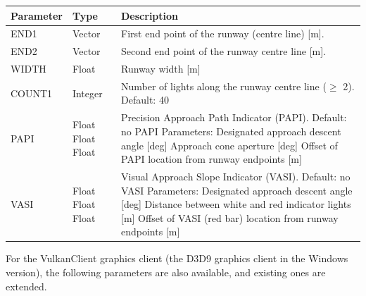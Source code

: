 \documentclass[Orbiter Developer Manual.tex]{subfiles}
\begin{document}
	\begin{longtable}{ |p{}|p{}|p{}| }
	\hline\rule{0pt}{2ex}
	\textbf{Parameter} & \textbf{Type} & \textbf{Description}\\
	\hline\rule{0pt}{2ex}
	END1 & Vector & First end point of the runway (centre line) [m].\\
	\hline\rule{0pt}{2ex}
	END2 & Vector & Second end point of the runway centre line [m].\\
	\hline\rule{0pt}{2ex}
	WIDTH & Float & Runway width [m]\\
	\hline\rule{0pt}{2ex}
	COUNT1 & Integer & Number of lights along the runway centre line ($\geq$ 2). Default: 40\\
	\hline\rule{0pt}{2ex}
	PAPI & Float Float Float & Precision Approach Path Indicator (PAPI). Default: no PAPI\newline
	Parameters:\newline
	Designated approach descent angle [deg]\newline
	Approach cone aperture [deg]\newline
	Offset of PAPI location from runway endpoints [m]\\
	\hline\rule{0pt}{2ex}
	VASI & Float Float Float & Visual Approach Slope Indicator (VASI). Default: no VASI\newline
	Parameters:\newline
	Designated approach descent angle [deg]\newline
	Distance between white and red indicator lights [m]\newline
	Offset of VASI (red bar) location from runway endpoints [m]\\
	\hline
	\end{longtable}

\noindent
For the VulkanClient graphics client (the D3D9 graphics client in the Windows version), the following parameters are also available, and existing ones are extended.
\end{document}
